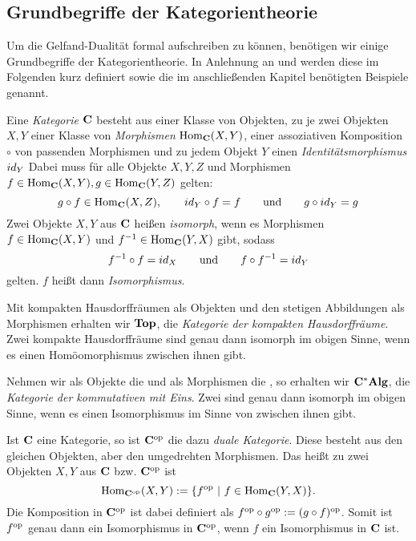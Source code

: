 \subsection{Grundbegriffe der Kategorientheorie}\label{sec:Kategorientheorie}

Um die Gelfand-Dualität formal aufschreiben zu können, benötigen wir einige Grundbegriffe der Kategorientheorie. In Anlehnung an \cite[S. 2-23]{Pizza2013} und \cite[S. 1-6]{Ambrogio2009} werden diese im Folgenden kurz definiert sowie die im anschließenden Kapitel benötigten Beispiele genannt.

\begin{defn}[Kategorie]
Eine \emph{Kategorie} $\mathbf{C}$ besteht aus einer Klasse von Objekten, zu je zwei Objekten $X, Y$ einer Klasse von \emph{Morphismen} $\mathrm{Hom}_{\mathbf{C}}(X,Y)$, einer assoziativen Komposition $\circ$ von \glqq passenden\grqq{} Morphismen und zu jedem Objekt $Y$ einen \emph{Identitätsmorphismus} $id_Y$ Dabei muss für alle Objekte $X, Y, Z$ und Morphismen $f \in \mathrm{Hom}_{\mathbf{C}}(X,Y), g \in \mathrm{Hom}_{\mathbf{C}}(Y,Z)$ gelten:
	\[g \circ f \in \mathrm{Hom}_{\mathbf{C}}(X,Z),\qquad id_Y \circ f = f \qquad\text{und}\qquad g \circ id_Y = g\]
Zwei Objekte $X, Y$ aus $\mathbf{C}$ heißen \emph{isomorph}, wenn es Morphismen $f \in \mathrm{Hom}_{\mathbf{C}}(X,Y)$ und $f^{-1} \in\mathrm{Hom}_{\mathbf{C}}(Y,X)$ gibt, sodass
	\[f^{-1} \circ f = id_X \qquad\text{und}\qquad f \circ f^{-1} = id_Y\]
gelten. $f$ heißt dann \emph{Isomorphismus}.
\end{defn}

\begin{bsp}
Mit kompakten Hausdorffräumen als Objekten und den stetigen Abbildungen als Morphismen erhalten wir $\mathbf{Top}$, die \emph{Kategorie der kompakten Hausdorffräume}. Zwei kompakte Hausdorffräume sind genau dann isomorph im obigen Sinne, wenn es einen Homöomorphismus zwischen ihnen gibt.
\end{bsp}

\begin{bsp}
Nehmen wir als Objekte die \CAlgn{} und als Morphismen die \CAlgHomn{}, so erhalten wir $\mathbf{C^*Alg}$, die \emph{Kategorie der kommutativen \CAlgn{} mit Eins}. Zwei \CAlgn{} sind genau dann isomorph im obigen Sinne, wenn es einen Isomorphismus im Sinne von  zwischen ihnen gibt.
\end{bsp}

\begin{bsp}
Ist $\mathbf{C}$ eine Kategorie, so ist $\mathbf{C}^{\mathrm{op}}$ die dazu \emph{duale Kategorie}. Diese besteht aus den gleichen Objekten, aber den \glqq umgedrehten\grqq{} Morphismen. Das heißt zu zwei Objekten $X, Y$ aus $\mathbf{C}$ bzw. $\mathbf{C}^{\mathrm{op}}$ ist 
	\[\mathrm{Hom}_{\mathbf{C}^{\mathrm{op}}}(X,Y) := \{f^{\mathrm{op}} ~|~ f \in \mathrm{Hom}_{\mathbf{C}}(Y,X)\}.\]
Die Komposition in $\mathbf{C}^{\mathrm{op}}$ ist dabei definiert als $f^{\mathrm{op}} \circ g^{\mathrm{op}} := (g \circ f)^{\mathrm{op}}$. Somit ist $f^{\mathrm{op}}$ genau dann ein Isomorphismus in $\mathbf{C}^{\mathrm{op}}$, wenn $f$ ein Isomorphismus in $\mathbf{C}$ ist.
\end{bsp}


